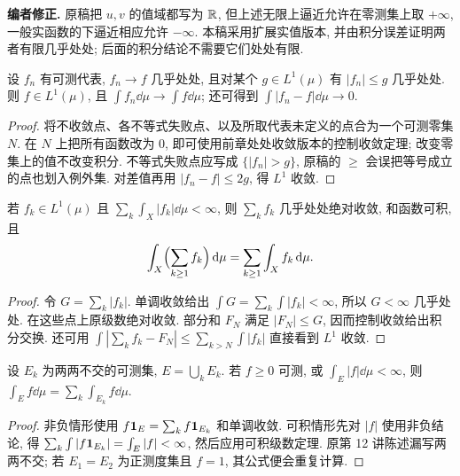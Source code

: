\begin{remark}
\textbf{编者修正.} 原稿把 $u,v$ 的值域都写为 $\mathbb R$, 但上述无限上逼近允许在零测集上取 $+\infty$, 一般实函数的下逼近相应允许 $-\infty$. 本稿采用扩展实值版本, 并由积分误差证明两者有限几乎处处; 后面的积分结论不需要它们处处有限.
\end{remark}


\begin{proposition}\label{ra:c4:aedct}
设 $f_n$ 有可测代表, $f_n\to f$ 几乎处处, 且对某个 $g\in L^1(\mu)$ 有 $|f_n|\le g$ 几乎处处. 则 $f\in L^1(\mu)$, 且 $\int f_n\dd\mu\to\int f\dd\mu$; 还可得到 $\int|f_n-f|\dd\mu\to0$.
\end{proposition}
\begin{proof}
将不收敛点、各不等式失败点、以及所取代表未定义的点合为一个可测零集 $N$. 在 $N$ 上把所有函数改为 $0$, 即可使用前章处处收敛版本的控制收敛定理; 改变零集上的值不改变积分. 不等式失败点应写成 $\{|f_n|>g\}$, 原稿的 $\ge$ 会误把等号成立的点也划入例外集. 对差值再用 $|f_n-f|\le2g$, 得 $L^1$ 收敛.
\end{proof}

\begin{theorem}[可积级数]\label{ra:c4:series}
若 $f_k\in L^1(\mu)$ 且 $\sum_k\int_X|f_k|\dd\mu<\infty$, 则 $\sum_kf_k$ 几乎处处绝对收敛, 和函数可积, 且
\[
 \int_X\Bigl(\sum_{k\ge1}f_k\Bigr)\,\mathrm d\mu
   =\sum_{k\ge1}\int_Xf_k\,\mathrm d\mu.
\]
\end{theorem}
\begin{proof}
令 $G=\sum_k|f_k|$. 单调收敛给出 $\int G=\sum_k\int|f_k|<\infty$, 所以 $G<\infty$ 几乎处处. 在这些点上原级数绝对收敛. 部分和 $F_N$ 满足 $|F_N|\le G$, 因而控制收敛给出积分交换. 还可用 $\int|\sum_kf_k-F_N|\le\sum_{k>N}\int|f_k|$ 直接看到 $L^1$ 收敛.
\end{proof}

\begin{proposition}[积分的可数可加性]\label{ra:c4:integraladditivity}
设 $E_k$ 为两两不交的可测集, $E=\bigcup_kE_k$. 若 $f\ge0$ 可测, 或 $\int_E|f|\dd\mu<\infty$, 则 $\int_Ef\dd\mu=\sum_k\int_{E_k}f\dd\mu$.
\end{proposition}
\begin{proof}
非负情形使用 $f\mathbf 1_E=\sum_kf\mathbf 1_{E_k}$ 和单调收敛. 可积情形先对 $|f|$ 使用非负结论, 得 $\sum_k\int|f\mathbf 1_{E_k}|=\int_E|f|<\infty$, 然后应用可积级数定理. 原第 12 讲陈述漏写两两不交; 若 $E_1=E_2$ 为正测度集且 $f=1$, 其公式便会重复计算.
\end{proof}

